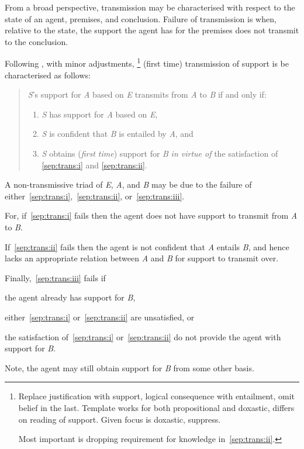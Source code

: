 \documentclass[10pt]{article}
\begin{document}
\begin{note}
  From a broad perspective, transmission may be characterised with respect to the state of an agent, premises, and conclusion.
  Failure of transmission is when, relative to the state, the support the agent has for the premises does not transmit to the conclusion.

  Following \textcite{Moretti:2018we,Moretti:2018tl}, with minor adjustments,\nolinebreak
  \footnote{
    Replace justification with support, logical consequence with entailment, omit belief in the last.
    Template works for both propositional and doxastic, differs on reading of support.
    Given focus is doxastic, suppress.

    Most important is dropping requirement for knowledge in~\ref{sep:trans:ii}.
    
  }
  (first time) transmission of support is be characterised as follows:
  \begin{quote}
    \emph{S}'s support for \emph{A} based on \emph{E} transmits from \emph{A} to \emph{B} if and only if:
    \begin{enumerate}[label=(T\arabic*), ref=(T\arabic*)]
    \item\label{sep:trans:i} \emph{S} has support for \emph{A} based on \emph{E},
    \item\label{sep:trans:ii} \emph{S} is confident that \emph{B} is entailed by \emph{A}, and
    \item\label{sep:trans:iii} \emph{S} obtains (\emph{first time}) support for \emph{B} \emph{in virtue of} the satisfaction of \ref{sep:trans:i} and \ref{sep:trans:ii}.
    \end{enumerate}
  \end{quote}
\end{note}

\begin{note}
  A non-transmissive triad of \emph{E}, \emph{A}, and \emph{B} may be due to the failure of either~\ref{sep:trans:i},~\ref{sep:trans:ii}, or~\ref{sep:trans:iii}.

  For, if~\ref{sep:trans:i} fails then the agent does not have support to transmit from \emph{A} to \emph{B}.

  If~\ref{sep:trans:ii} fails then the agent is not confident that \emph{A} entails \emph{B}, and hence lacks an appropriate relation between \emph{A} and \emph{B} for support to transmit over.

  Finally,~\ref{sep:trans:iii} fails if
  \begin{enumerate*}
  \item the agent already has support for \emph{B},
  \item either~\ref{sep:trans:i} or~\ref{sep:trans:ii} are unsatisfied, or
  \item the satisfaction of~\ref{sep:trans:i} or~\ref{sep:trans:ii} do not provide the agent with support for \emph{B}.
  \end{enumerate*}
  Note, the agent may still obtain support for \emph{B} from some other basis.
\end{note}
\end{document}
